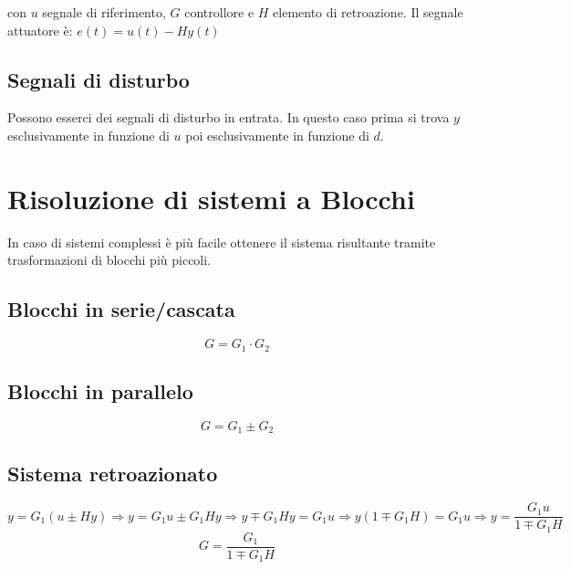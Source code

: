 \begin{center}
	
\end{center}	
	con $ u $ segnale di riferimento, $ G $ controllore e $ H $ elemento di retroazione. Il segnale attuatore è: $ e(t)=u(t)-Hy(t) $
	
\subsection{Segnali di disturbo}

Possono esserci dei segnali di disturbo in entrata. In questo caso prima si trova $ y $ esclusivamente in funzione di $ u $ poi esclusivamente in funzione di $ d $. %

\begin{center}
	
\end{center}

\section{Risoluzione di sistemi a Blocchi}
In caso di sistemi complessi è più facile ottenere il sistema risultante tramite trasformazioni di blocchi più piccoli.

\subsection{Blocchi in serie/cascata}
\begin{center}
	
\end{center}

\[
	G=G_1 \cdot G_2
\]

\subsection{Blocchi in parallelo}
\begin{center}
	
\end{center}

\[
G=G_1 \pm G_2
\]


\subsection{Sistema retroazionato}
\begin{center}
	
\end{center}
\[
	y= G_1(u \pm Hy) 
	\Rightarrow y = G_1 u \pm G_1 Hy
	\Rightarrow y \mp G_1 Hy= G_1 u 
	\Rightarrow y(1\mp G_1 H)= G_1 u
	\Rightarrow y= \frac{G_1 u}{1\mp G_1 H}	
\]
\[
	G = \frac{G_1 }{1\mp G_1 H}
\]

